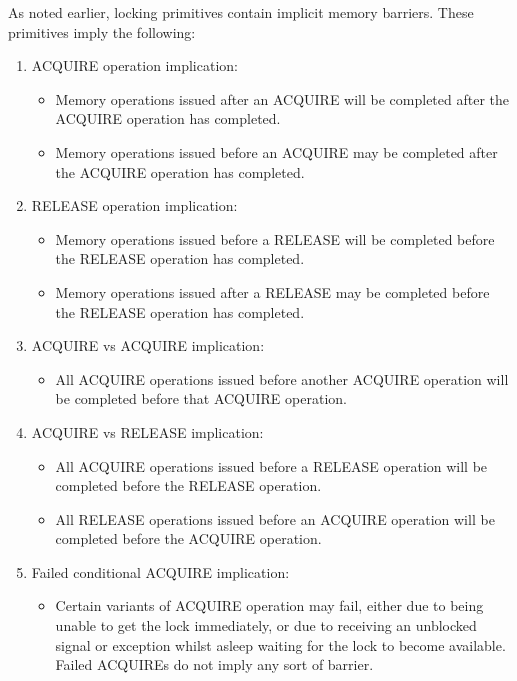 As noted earlier, locking primitives contain implicit memory barriers.
These primitives imply the following:
\begin{enumerate}
\item	ACQUIRE operation implication:
	\begin{itemize}
	\item	Memory operations issued after an ACQUIRE will be completed
		after the ACQUIRE operation has completed.
	\item	Memory operations issued before an ACQUIRE may be completed
		after the ACQUIRE operation has completed.
	\end{itemize}
\item	RELEASE operation implication:
	\begin{itemize}
	\item	Memory operations issued before a RELEASE will be
		completed before the RELEASE operation has completed.
	\item	Memory operations issued after a RELEASE may be completed
		before the RELEASE operation has completed.
	\end{itemize}
\item	ACQUIRE vs ACQUIRE implication:
	\begin{itemize}
	\item	All ACQUIRE operations issued before another ACQUIRE operation
		will be completed before that ACQUIRE operation.
	\end{itemize}
\item	ACQUIRE vs RELEASE implication:
	\begin{itemize}
	\item	All ACQUIRE operations issued before a RELEASE operation
		will be completed before the RELEASE operation.
	\item	All RELEASE operations issued before an ACQUIRE operation
		will be completed before the ACQUIRE operation.
	\end{itemize}
\item	Failed conditional ACQUIRE implication:
	\begin{itemize}
	\item	Certain variants of ACQUIRE operation may fail, either
		due to being unable to get the lock immediately, or due
		to receiving an unblocked signal or exception
		whilst asleep waiting
		for the lock to become available.  Failed ACQUIREs do not
		imply any sort of barrier.
	\end{itemize}
\end{enumerate}

